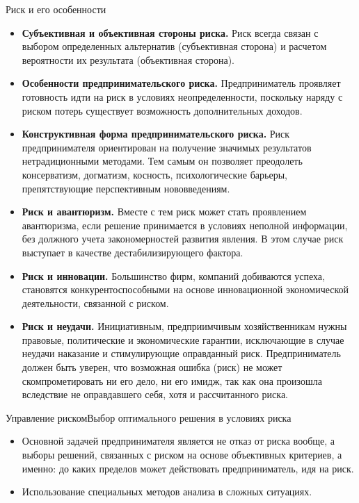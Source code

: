 \documentclass[_fin_decisions_lectures.tex]{subfiles}
\begin{document}
\begin{frame}[allowframebreaks]{Риск и его особенности}{}
  \begin{itemize}
  \item
  \textbf{Субъективная и объективная стороны риска.} Риск всегда связан с выбором определенных альтернатив (субъективная сторона) и расчетом вероятности их результата (объективная сторона).
  \item
  \textbf{Особенности предпринимательского риска.} Предприниматель проявляет готовность идти на риск в условиях неопределенности, поскольку наряду с риском потерь существует возможность дополнительных доходов. 
  
  \pagebreak
  \item
  \textbf{Конструктивная форма предпринимательского риска.} Риск предпринимателя ориентирован на получение значимых результатов нетрадиционными методами. Тем самым он позволяет преодолеть консерватизм, догматизм, косность, психологические барьеры, препятствующие перспективным нововведениям. 
  \pagebreak
  \item
  \textbf{Риск и авантюризм.} Вместе с тем риск может стать проявлением авантюризма, если решение принимается в условиях неполной информации, без должного учета закономерностей развития явления. В этом случае риск выступает в качестве дестабилизирующего фактора.
  \item
  \textbf{Риск и инновации.} Большинство фирм, компаний добиваются успеха, становятся конкурентоспособными на основе инновационной экономической деятельности, связанной с риском.
  \pagebreak
	\item
\textbf{Риск и неудачи. }Инициативным, предприимчивым хозяйственникам нужны правовые, политические и экономические гарантии, исключающие в случае неудачи наказание и стимулирующие оправданный риск. Предприниматель должен быть уверен, что возможная ошибка (риск) не может скомпрометировать ни его дело, ни его имидж, так как она произошла вследствие не оправдавшего себя, хотя и рассчитанного риска.
  \end{itemize}
\end{frame}

\begin{frame}{Управление риском}{Выбор оптимального решения в условиях риска}
  \begin{itemize}
  \item
	Основной задачей предпринимателя является не отказ от риска вообще, а выборы решений, связанных с риском на основе объективных критериев, а именно: до каких пределов может действовать предприниматель, идя на риск.
  \item
	Использование специальных методов анализа в сложных ситуациях.
  \end{itemize}
\end{frame}
\end{document}
